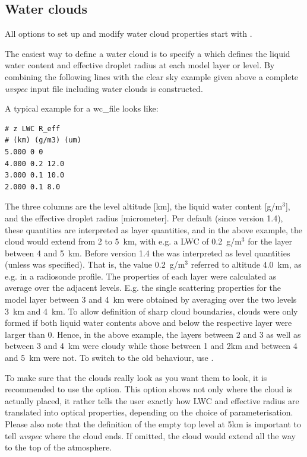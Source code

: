 \subsection{Water clouds \label{seq:wc}}

All options to set up and modify water cloud properties start with
.

The easiest way to define a water cloud is to specify a
 which defines the liquid water content and effective
droplet radius at each model layer or level. By combining the
following lines with the clear sky example given above a complete
{\sl uvspec} input file including water clouds is constructed.


A typical example for a wc\_file looks like:

\begin{Verbatim}[fontsize=\footnotesize, frame=single] 
# z LWC R_eff 
# (km) (g/m3) (um) 
5.000 0 0 
4.000 0.2 12.0 
3.000 0.1 10.0 
2.000 0.1 8.0
\end{Verbatim}

The three columns are the level altitude [km], the liquid water
content [g/m$^3$], and the effective droplet radius [micrometer]. Per
default (since version 1.4), these quantities are interpreted as layer
quantities, and in the above example, the cloud would extend from 2 to
5~km, with e.g. a LWC of 0.2~g/m$^3$ for the layer between 4 and
5~km. Before version 1.4 the  was interpreted as level
quantities (unless  was specified). That is, the value
0.2~g/m$^3$ referred to altitude 4.0~km, as e.g. in a radiosonde
profile. The properties of each layer were calculated as average over
the adjacent levels. E.g. the single scattering properties for the
model layer between 3 and 4~km were obtained by averaging over the two
levels 3~km and 4~km. To allow definition of sharp cloud boundaries,
clouds were only formed if both liquid water contents above and below
the respective layer were larger than 0. Hence, in the above example,
the layers between 2 and 3 as well as between 3 and 4~km were cloudy
while those between 1 and 2km and between 4 and 5~km were not. To
switch to the old behaviour, use .

To make sure that the clouds really look as you want them to look, it
is recommended to use the  option. This option shows not
only where the cloud is actually placed, it rather tells the user
exactly how LWC and effective radius are translated into optical
properties, depending on the choice of parameterisation. Please also
note that the definition of the empty top level at 5km is important to
tell {\sl uvspec} where the cloud ends. If omitted, the cloud would
extend all the way to the top of the atmosphere.

